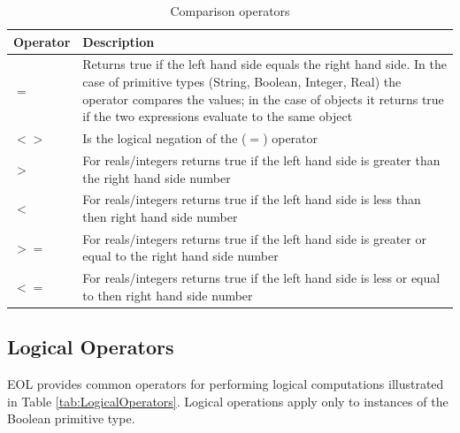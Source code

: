 \begin{longtable} {|p{5.5cm}|p{6.5cm}|}
			
			\caption{Comparison operators}
			\label{tab:ComparisonOperators}\\
			
			\hline
							
			\textbf{Operator} & \textbf{Description} \\\hline

			$=$ & Returns true if the left hand side equals the right hand side. In the case of primitive types (String, Boolean, Integer, Real) the operator compares the values; in the case of objects it returns true if the two expressions evaluate to the same object \\\hline
			
			$<>$ & Is the logical negation of the ($=$) operator \\\hline
				
			$>$ & For reals/integers returns true if the left hand side is greater than the right hand side number \\\hline
			
			$<$ & For reals/integers returns true if the left hand side is less than then right hand side number \\\hline
			
			$>=$ & For reals/integers returns true if the left hand side is greater or equal to the right hand side number \\\hline
			
			$<=$ & For reals/integers returns true if the left hand side is less or equal to then right hand side number \\\hline
		
\end{longtable}

\subsection{Logical Operators}

EOL provides common operators for performing logical computations illustrated in Table \ref{tab:LogicalOperators}. Logical operations apply only to instances of the Boolean primitive type.


